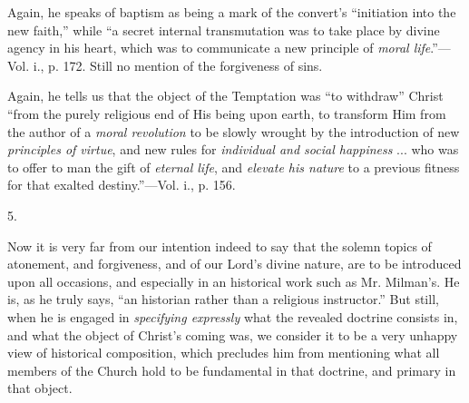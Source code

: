 Again, he speaks of baptism as being a mark of
the convert's ``initiation into the new faith,'' while ``a secret
internal transmutation was to take place by divine agency in his
heart, which was to communicate a new principle of \emph{moral life}.''—Vol.
i., p. 172. Still no mention of the forgiveness of sins.

Again, he tells us that the object
of the Temptation was ``to withdraw'' Christ ``from the purely religious
end of His being upon earth, to transform Him from the author of a \emph{moral
revolution} to be slowly wrought by the introduction of new \emph{principles
of virtue}, and new rules for \emph{individual and social happiness}
... who was to offer to man the gift of \emph{eternal life}, and \emph{elevate
his nature} to a previous fitness for that exalted destiny.''—Vol.
i., p. 156.

5.

Now it is very far from our intention indeed to
say that the solemn topics of atonement, and forgiveness, and of
our Lord's divine nature, are to be introduced upon all occasions, and
especially in an historical work such as Mr. Milman's. He is, as he
truly says, ``an historian rather than a religious instructor.'' But
still, when he is engaged in \emph{specifying expressly} what the
revealed doctrine consists in, and what the object of Christ's coming
was, we consider it to be a very unhappy view of historical
composition, which precludes him from mentioning what all members of
the Church hold to be fundamental in that doctrine, and primary in
that object.

